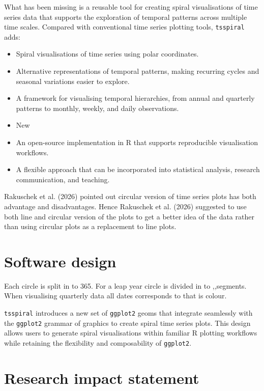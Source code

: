 \documentclass[10pt,a4paper,onecolumn]{article}
\providecommand{\tightlist}{%
  \setlength{\itemsep}{0pt}\setlength{\parskip}{0pt}}
\begin{document}
What has been missing is a reusable tool for creating spiral
visualisations of time series data that supports the exploration of
temporal patterns across multiple time scales. Compared with
conventional time series plotting tools, \texttt{tsspiral} adds:

\begin{itemize}
\tightlist
\item
  Spiral visualisations of time series using polar coordinates.
\item
  Alternative representations of temporal patterns, making recurring
  cycles and seasonal variations easier to explore.
\item
  A framework for visualising temporal hierarchies, from annual and
  quarterly patterns to monthly, weekly, and daily observations.
\item
  New
\item
  An open-source implementation in R that supports reproducible
  visualisation workflows.
\item
  A flexible approach that can be incorporated into statistical
  analysis, research communication, and teaching.
\end{itemize}

Rakuschek et al. (2026) pointed out circular version of time series
plots has both advantage and disadvantages. Hence Rakuschek et al.
(2026) suggested to use both line and circular version of the plots to
get a better idea of the data rather than using circular plots as a
replacement to line plots.

\section{Software design}\label{software-design}

Each circle is split in to 365. For a leap year circle is divided in to
,,segments. When visualising quarterly data all dates corresponds to
that is colour.

\texttt{tsspiral} introduces a new set of \texttt{ggplot2} geoms that
integrate seamlessly with the \texttt{ggplot2} grammar of graphics to
create spiral time series plots. This design allows users to generate
spiral visualisations within familiar R plotting workflows while
retaining the flexibility and composability of \texttt{ggplot2}.

\section{Research impact statement}\label{research-impact-statement}
\end{document}
